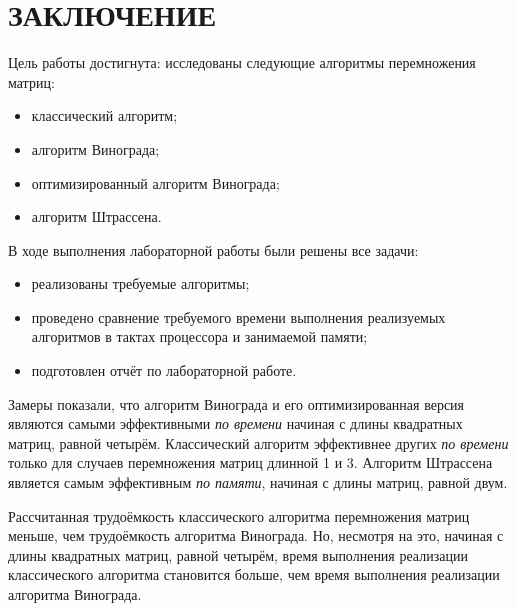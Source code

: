 \section*{ЗАКЛЮЧЕНИЕ}

Цель работы достигнута: исследованы следующие алгоритмы перемножения матриц:
\begin{itemize}
	\item классический алгоритм;
	\item алгоритм Винограда;
	\item оптимизированный алгоритм Винограда;
	\item алгоритм Штрассена.
\end{itemize}

В ходе выполнения лабораторной работы были решены все задачи:
\begin{itemize}
	\item реализованы требуемые алгоритмы;
	\item проведено сравнение требуемого времени выполнения реализуемых алгоритмов в тактах процессора и занимаемой памяти;
	\item подготовлен отчёт по лабораторной работе.
\end{itemize}

Замеры показали, что алгоритм Винограда и его оптимизированная версия являются самыми эффективными \textit{по времени} начиная с длины квадратных матриц, равной четырём.
Классический алгоритм эффективнее других \textit{по времени} только для случаев перемножения матриц длинной 1 и 3.
Алгоритм Штрассена является самым эффективным \textit{по памяти}, начиная с длины матриц, равной двум.

Рассчитанная трудоёмкость классического алгоритма перемножения матриц меньше, чем трудоёмкость алгоритма Винограда.
Но, несмотря на это, начиная с длины квадратных матриц, равной четырём, время выполнения реализации классического алгоритма становится больше, чем время выполнения реализации алгоритма Винограда.